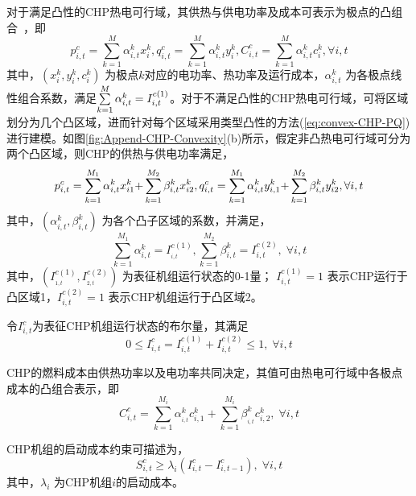 对于满足凸性的CHP热电可行域，其供热与供电功率及成本可表示为极点的凸组合~\cite{CHP-Model-03, CHP-Model-CXY-15,IES-Model-CXY-18}，即
\begin{equation}
\label{eq:convex-CHP-PQ}
p_{i,t}^c = \sum\limits_{k = 1}^M {\alpha _{i,t}^kx_i^k,q_{i,t}^c = \sum\limits_{k = 1}^M {\alpha _{i,t}^ky_i^k} ,C_{i,t}^c = \sum\limits_{k = 1}^M {\alpha _{i,t}^kc_i^k} }, \forall i,t
\end{equation}
其中，$(x_i^k,y_i^k,c_i^k)$ 为极点$k$对应的电功率、热功率及运行成本，$\alpha _{i,t}^k$ 为各极点线性组合系数，满足$\sum\limits_{k{\rm{ = }}1}^M {\alpha _{i,t}^k}  = I_{i,t}^{c(1)}$。对于不满足凸性的CHP热电可行域，可将区域划分为几个凸区域，进而针对每个区域采用类型凸性的方法(\ref{eq:convex-CHP-PQ})进行建模。如图\ref{fig:Append-CHP-Convexity}(b)所示，假定非凸热电可行域可分为两个凸区域，则CHP的供热与供电功率满足，
\begin{equation}
\label{eq:non-convex-CHP-PQ}
p_{i,t}^c = \sum\limits_{k = 1}^{{M_1}} {\alpha _{i,t}^kx_{i1}^k} {\rm{ + }}\sum\limits_{k = 1}^{{M_2}} {\beta _{i,t}^kx_{i2}^k} ,q_{i,t}^c = \sum\limits_{k = 1}^{{M_1}} {\alpha _{i,t}^ky_{i,1}^k} {\rm{ + }}\sum\limits_{k = 1}^{{M_2}} {\beta _{i,t}^ky_{i2}^k}, \forall i,t
\end{equation}
其中，$(\alpha _{i,t}^k,\beta _{i,t}^k)$ 为各个凸子区域的系数，并满足，
\begin{equation}
\sum\limits_{k = 1}^{{M_1}} {\alpha _{i,t}^k}  = I_{_{i,t}}^{c(1)},\sum\limits_{k = 1}^{{M_2}} {\beta _{i,t}^k}  = I_{i,t}^{c(2)},\;\forall i,t
\end{equation}
其中，$(I_{_{1,t}}^{c(1)},I_{_{2,t}}^{c(2)})$ 为表征机组运行状态的0-1量； $I_{i,t}^{c(1)} = 1$ 表示CHP运行于凸区域1，$I_{i,t}^{c(2)} = 1$ 表示CHP机组运行于凸区域2。

令$I_{i,t}^c$为表征CHP机组运行状态的布尔量，其满足
\begin{equation}
0 \le I_{i,t}^c = I_{i,t}^{c(1)} + I_{i,t}^{c(2)} \le 1, \; \forall i, t
\end{equation}

CHP的燃料成本由供热功率以及电功率共同决定，其值可由热电可行域中各极点成本的凸组合表示，即
\begin{equation}
C_{i,t}^c = \sum\limits_{k = 1}^{{M_i}} {\alpha _{_{i,t}}^kc_{i,1}^k}  + \sum\limits_{k = 1}^{{M_i}} {\beta _{_{i,t}}^kc_{i,2}^k}, \; \forall i,t
\end{equation}

CHP机组的启动成本约束可描述为，
\begin{equation}
S_{i,t}^c \ge {\lambda _i}(I_{i,t}^c - I_{i,t - 1}^c), \; \forall i,t
\end{equation}
其中，$\lambda _i$ 为CHP机组$i$的启动成本。

